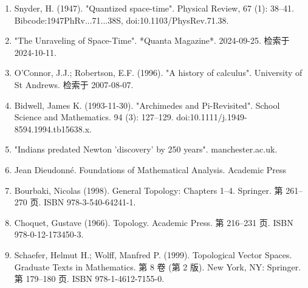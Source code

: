 \begin{enumerate}
\item Snyder, H. (1947). "Quantized space-time". Physical Review, 67 (1): 38–41. Bibcode:1947PhRv...71...38S, doi:10.1103/PhysRev.71.38.
\item "The Unraveling of Space-Time". *Quanta Magazine*. 2024-09-25. 检索于 2024-10-11.
\item O'Connor, J.J.; Robertson, E.F. (1996). "A history of calculus". University of St Andrews. 检索于 2007-08-07.
\item Bidwell, James K. (1993-11-30). "Archimedes and Pi-Revisited". School Science and Mathematics. 94 (3): 127–129. doi:10.1111/j.1949-8594.1994.tb15638.x.
\item "Indians predated Newton 'discovery' by 250 years". manchester.ac.uk.
\item Jean Dieudonné. Foundations of Mathematical Analysis. Academic Press 
\item Bourbaki, Nicolas (1998). General Topology: Chapters 1–4. Springer. 第 261–270 页. ISBN 978-3-540-64241-1.
\item Choquet, Gustave (1966). Topology. Academic Press. 第 216–231 页. ISBN 978-0-12-173450-3.
\item Schaefer, Helmut H.; Wolff, Manfred P. (1999). Topological Vector Spaces. Graduate Texts in Mathematics. 第 8 卷 (第 2 版). New York, NY: Springer. 第 179–180 页. ISBN 978-1-4612-7155-0.
\end{enumerate}
